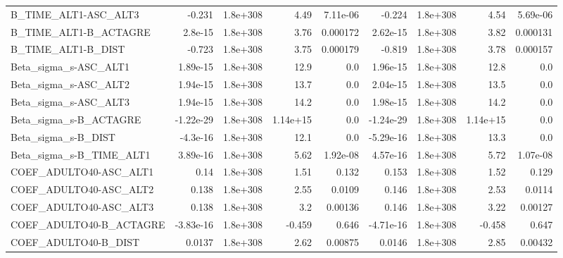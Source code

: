 \begin{tabular}{lrrrrrrrr}
B\_TIME\_ALT1-ASC\_ALT3              &      -0.231 &     1.8e+308 &      4.49 & 7.11e-06 &     -0.224 &    1.8e+308 &         4.54 &      5.69e-06 \\
B\_TIME\_ALT1-B\_ACTAGRE             &     2.8e-15 &     1.8e+308 &      3.76 & 0.000172 &   2.62e-15 &    1.8e+308 &         3.82 &      0.000131 \\
B\_TIME\_ALT1-B\_DIST                &      -0.723 &     1.8e+308 &      3.75 & 0.000179 &     -0.819 &    1.8e+308 &         3.78 &      0.000157 \\
Beta\_sigma\_s-ASC\_ALT1             &    1.89e-15 &     1.8e+308 &      12.9 &      0.0 &   1.96e-15 &    1.8e+308 &         12.8 &           0.0 \\
Beta\_sigma\_s-ASC\_ALT2             &    1.94e-15 &     1.8e+308 &      13.7 &      0.0 &   2.04e-15 &    1.8e+308 &         13.5 &           0.0 \\
Beta\_sigma\_s-ASC\_ALT3             &    1.94e-15 &     1.8e+308 &      14.2 &      0.0 &   1.98e-15 &    1.8e+308 &         14.2 &           0.0 \\
Beta\_sigma\_s-B\_ACTAGRE            &   -1.22e-29 &     1.8e+308 &  1.14e+15 &      0.0 &  -1.24e-29 &    1.8e+308 &     1.14e+15 &           0.0 \\
Beta\_sigma\_s-B\_DIST               &    -4.3e-16 &     1.8e+308 &      12.1 &      0.0 &  -5.29e-16 &    1.8e+308 &         13.3 &           0.0 \\
Beta\_sigma\_s-B\_TIME\_ALT1          &    3.89e-16 &     1.8e+308 &      5.62 & 1.92e-08 &   4.57e-16 &    1.8e+308 &         5.72 &      1.07e-08 \\
COEF\_ADULTO40-ASC\_ALT1            &        0.14 &     1.8e+308 &      1.51 &    0.132 &      0.153 &    1.8e+308 &         1.52 &         0.129 \\
COEF\_ADULTO40-ASC\_ALT2            &       0.138 &     1.8e+308 &      2.55 &   0.0109 &      0.146 &    1.8e+308 &         2.53 &        0.0114 \\
COEF\_ADULTO40-ASC\_ALT3            &       0.138 &     1.8e+308 &       3.2 &  0.00136 &      0.146 &    1.8e+308 &         3.22 &       0.00127 \\
COEF\_ADULTO40-B\_ACTAGRE           &   -3.83e-16 &     1.8e+308 &    -0.459 &    0.646 &  -4.71e-16 &    1.8e+308 &       -0.458 &         0.647 \\
COEF\_ADULTO40-B\_DIST              &      0.0137 &     1.8e+308 &      2.62 &  0.00875 &     0.0146 &    1.8e+308 &         2.85 &       0.00432 \\

\end{tabular}
